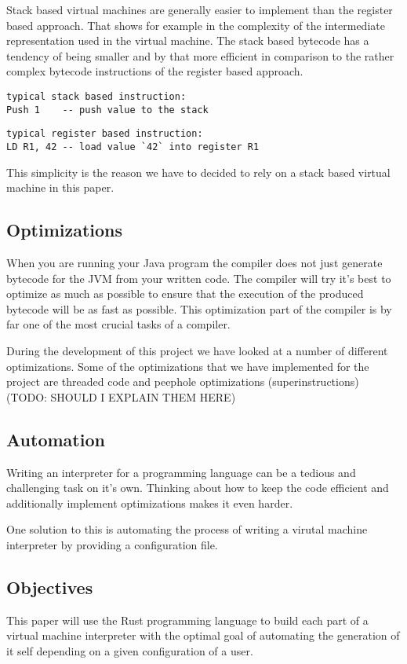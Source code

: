 \documentclass{article}
\begin{document}
Stack based virtual machines are generally easier to implement than the register based approach.
That shows for example in the complexity of the intermediate representation used in the virtual 
machine. The stack based bytecode has a tendency of being smaller and by that more efficient in 
comparison to the rather complex bytecode instructions of the register based approach.

\begin{verbatim}
typical stack based instruction:
Push 1    -- push value to the stack
\end{verbatim}

\begin{verbatim}
typical register based instruction:
LD R1, 42 -- load value `42` into register R1
\end{verbatim}

This simplicity is the reason we have to decided to rely on a stack based virtual machine in
this paper.

\subsection{Optimizations}
When you are running your Java program the compiler does not just generate bytecode for
the JVM from your written code. The compiler will try it's best to optimize as much as possible
to ensure that the execution of the produced bytecode will be as fast as possible.
This optimization part of the compiler is by far one of the most crucial tasks of a compiler.

During the development of this project we have looked at a number of different
optimizations. Some of the optimizations that we have implemented for the
project are threaded code and peephole optimizations (superinstructions) (TODO:
SHOULD I EXPLAIN THEM HERE)


\subsection{Automation}
Writing an interpreter for a programming language can be a tedious and
challenging task on it's own. Thinking about how to keep the code efficient and
additionally implement optimizations makes it even harder.

One solution to this is automating the process of writing a virutal machine interpreter
by providing a configuration file.

\subsection{Objectives}
This paper will use the Rust programming language to build each part of a virtual machine 
interpreter with the optimal goal of automating the generation of it self depending on
a given configuration of a user.
\end{document}
